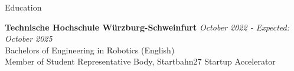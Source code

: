 \documentclass[
	a4paper, %
    10pt, %
]{resume} %
\begin{document}

\begin{rSection}{Education}

	\textbf{Technische Hochschule Würzburg-Schweinfurt} \hfill \textit{October 2022 - Expected: October 2025} \\
	Bachelors of Engineering in Robotics (English) \\
	Member of Student Representative Body, Startbahn27 Startup Accelerator

\end{rSection}

\end{document}
